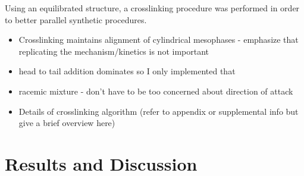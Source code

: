 \documentclass{article}
\begin{document}
	Using an equilibrated structure, a crosslinking procedure was performed in order to better parallel synthetic procedures. 
	\begin{itemize}
		\item Crosslinking maintains alignment of cylindrical mesophases - emphasize that replicating the mechanism/kinetics is not important 
		\item head to tail addition dominates so I only implemented that
		\item racemic mixture - don't have to be too concerned about direction of attack 
		\item Details of crosslinking algorithm (refer to appendix or supplemental info but give a brief overview here)
	\end{itemize}  
	
	\section{Results and Discussion}
	
\end{document}
